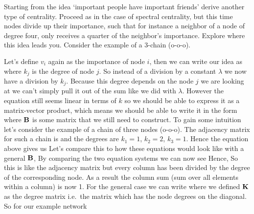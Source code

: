 Starting from the idea `important people have important friends' derive another type of centrality. Proceed as in the case of spectral centrality, but this time nodes divide up their importance, such that for instance a neighbor of a node of degree four, only receives a quarter of the neighbor's importance. Explore where this idea leads you. Consider the example of a 3-chain (o-o-o).

\solution 
Let's define $v_i$ again as the importance of node $i$, then we can write our idea as  
where $k_j$ is the degree of node $j$. So instead of a division by a constant $\lambda$ we now have a division by $k_j$. Because this degree depends on the node $j$ we are looking at we can't simply pull it out of the sum like we did with $\lambda$. However the equation still seems linear in terms of $k$ so we should be able to express it as a matrix-vector product, which means we should be able to write it in the form 
where $\bf B$ is some matrix that we still need to construct. To gain some intuition let's consider the example of a chain of three nodes (o-o-o). The adjacency matrix for such a chain is 
and the degrees are $k_1=1$, $k_2=2$, $k_3=1$. Hence the equation above gives us 
Let's compare this to how these equations would look like with a general $\bf B$, 
By comparing the two equation systems we can now see 
Hence, 
So this is like the adjacency matrix but every column has been divided by the degree of the corresponding node. As a result the column sum (sum over all elements within a column) is now 1. For the general case we can write 
where we defined $\bf K$ as the degree matrix i.e.~the matrix which has the node degrees on the diagonal. So for our example network
